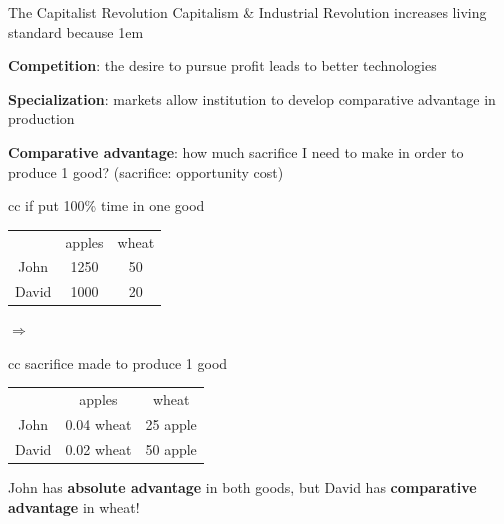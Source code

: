 \documentclass[11pt,aspectratio=43,usenames,dvipsnames]{beamer}
\let\oldenumerate=\enumerate
\let\endoldenumerate=\endenumerate
\renewenvironment{enumerate}{\oldenumerate \itemsep1em}{ \endoldenumerate}
\theoremstyle{definition}
\begin{document}
\begin{frame}{The Capitalist Revolution}
\label{slide:The_Capitalist_Revolution}
    Capitalism \& Industrial Revolution increases living standard because
    \begin{enumerate}
        \item \textbf{Competition}: the desire to pursue profit leads to better technologies
        \item \textbf{Specialization}: markets allow institution to develop \alert{comparative advantage} in production
        \item \textbf{Comparative advantage}: how much \alert{sacrifice} I need to make in order to produce \alert{1 good}? (sacrifice: opportunity cost)
    \end{enumerate}
    \begin{tabular}{cc}
        if put 100\% time in one good
        \\
        \begin{tabular}{ccc}
                & apples
                & wheat
            \\
            John
                & 1250
                & 50
            \\
            David
                & 1000
                & 20
            \\
        \end{tabular}
    \end{tabular}
    $ \Longrightarrow $
    \begin{tabular}{cc}
        sacrifice made to produce 1 good
        \\
        \begin{tabular}{ccc}
                & apples
                & wheat
            \\
            John
                & 0.04 wheat
                & 25 apple
            \\
            David
                & 0.02 wheat
                & 50 apple
            \\
        \end{tabular}
    \end{tabular}

    John has \textbf{absolute advantage} in both goods, but David has \textbf{comparative advantage} in wheat!
\end{frame}
\end{document}
